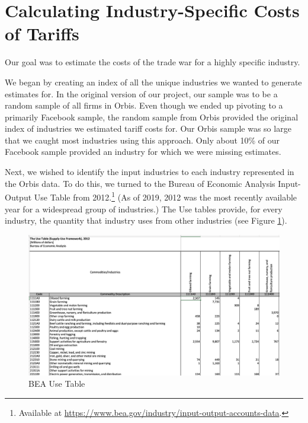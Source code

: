 


\section{Calculating Industry-Specific Costs of Tariffs}

Our goal was to estimate the costs of the trade war for a highly specific industry.

We began by creating an index of all the unique industries we wanted to generate estimates for. In the original version of our project, our sample was to be a random sample of all firms in Orbis. Even though we ended up pivoting to a primarily Facebook sample, the random sample from Orbis provided the original index of industries we estimated tariff costs for. Our Orbis sample was so large that we caught most industries using this approach. Only about 10\% of our Facebook sample provided an industry for which we were missing estimates.

Next, we wished to identify the input industries to each industry represented in the Orbis data. To do this, we turned to the Bureau of Economic Analysis Input-Output Use Table from 2012.\footnote{Available at \url{https://www.bea.gov/industry/input-output-accounts-data}.} (As of 2019, 2012 was the most recently available year for a widespread group of industries.) The Use tables provide, for every industry, the quantity that industry uses from other industries (see Figure \ref{fig:bea}).

\begin{figure}
    \centering
\includegraphics[scale=.4]{bea.png}
    \caption{BEA Use Table}
    \label{fig:bea}
\end{figure}

